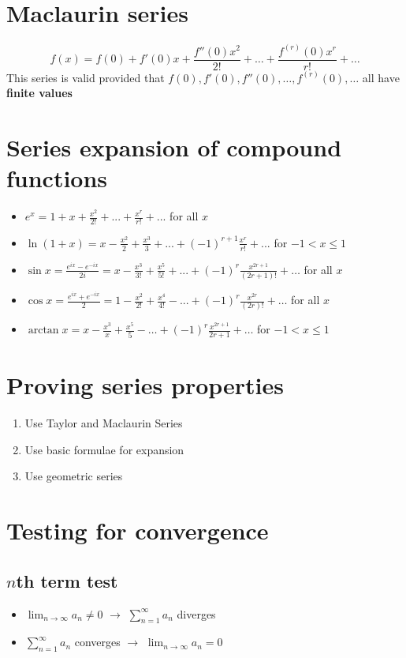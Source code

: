 \section{Maclaurin series}
$$f(x)=f(0)+f'(0)x+\frac{f''(0)x^2}{2!}+\dots+\frac{f^{(r)}(0)x^r}{r!}+\dots$$
This series is valid provided that $f(0), f'(0), f''(0),\dots,f^{(r)}(0),\dots$ all have \textbf{finite values}

\section{Series expansion of compound functions}
\begin{itemize}
    \item $e^{x}=1+x+\frac{x^{2}}{2!}+...+\frac{x^{r}}{r!}+...$ for all $x$
    \item $\ln(1+x) = x - \frac{x^{2}}{2} + \frac{x^{3}}{3} + ... + (-1)^{r+1}\frac{x^{r}}{r!} +...$ for $-1<x\leq1$
    \item $\sin x = \frac{e^{ix}-e^{-ix}}{2i}=x-\frac{x^{3}}{3!}+\frac{x^{5}}{5!}+...+(-1)^r\frac{x^{2r+1}}{(2r+1)!}+\dots$ for all $x$
    \item $\cos x = \frac{e^{ix}+e^{-ix}}{2}=1-\frac{x^{2}}{2!}+\frac{x^{4}}{4!}-...+(-1)^r\frac{x^{2r}}{(2r)!}+\dots$ for all $x$
    \item $\arctan x = x-\frac{x^3}{x}+\frac{x^5}{5}-\dots+(-1)^r\frac{x^{2r+1}}{2r+1}+\dots$ for $-1<x\leq1$
\end{itemize}

\section{Proving series properties}
\begin{enumerate}
    \item Use Taylor and Maclaurin Series
    \item Use basic formulae for expansion
    \item Use geometric series
\end{enumerate}

\section{Testing for convergence}
\subsection{$n$th term test}
\begin{itemize}
    \item $\lim_{n\rightarrow\infty}a_n \neq 0$ $\rightarrow$ $\sum_{n=1}^{\infty}a_n$ diverges
    \item $\sum_{n=1}^{\infty}a_n$ converges $\rightarrow$ $\lim_{n\rightarrow\infty}a_n = 0$
\end{itemize}

